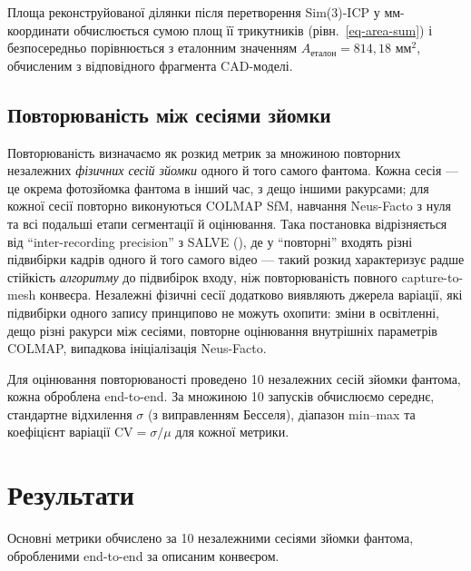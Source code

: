 \documentclass[
  ukrainian,
  10pt,
  a4paper,
  twocolumn]{article}
\begin{document}



Площа реконструйованої ділянки після перетворення Sim(3)-ICP у
мм-координати обчислюється сумою площ її трикутників
(рівн.~\ref{eq-area-sum}) і безпосередньо порівнюється з еталонним
значенням \(A_{\text{еталон}} = 814,18\) мм\(^2\), обчисленим з
відповідного фрагмента CAD-моделі.

\subsection{Повторюваність між сесіями
зйомки}\label{ux43fux43eux432ux442ux43eux440ux44eux432ux430ux43dux456ux441ux442ux44c-ux43cux456ux436-ux441ux435ux441ux456ux44fux43cux438-ux437ux439ux43eux43cux43aux438}

Повторюваність визначаємо як розкид метрик за множиною повторних
незалежних \emph{фізичних сесій зйомки} одного й того самого фантома.
Кожна сесія --- це окрема фотозйомка фантома в інший час, з дещо іншими
ракурсами; для кожної сесії повторно виконуються COLMAP SfM, навчання
Neus-Facto з нуля та всі подальші етапи сегментації й оцінювання. Така
постановка відрізняється від ``inter-recording precision'' з SALVE
(), де
у ``повторні'' входять різні підвибірки кадрів одного й того самого
відео --- такий розкид характеризує радше стійкість \emph{алгоритму} до
підвибірок входу, ніж повторюваність повного capture-to-mesh конвеєра.
Незалежні фізичні сесії додатково виявляють джерела варіації, які
підвибірки одного запису принципово не можуть охопити: зміни в
освітленні, дещо різні ракурси між сесіями, повторне оцінювання
внутрішніх параметрів COLMAP, випадкова ініціалізація Neus-Facto.

Для оцінювання повторюваності проведено 10 незалежних сесій зйомки
фантома, кожна оброблена end-to-end. За множиною 10 запусків обчислюємо
середнє, стандартне відхилення \(\sigma\) (з виправленням Бесселя),
діапазон min--max та коефіцієнт варіації CV\(=\sigma/\mu\) для кожної
метрики.

\FloatBarrier

\section{Результати}\label{ux440ux435ux437ux443ux43bux44cux442ux430ux442ux438}

Основні метрики обчислено за 10 незалежними сесіями зйомки фантома,
обробленими end-to-end за описаним конвеєром.
\end{document}
